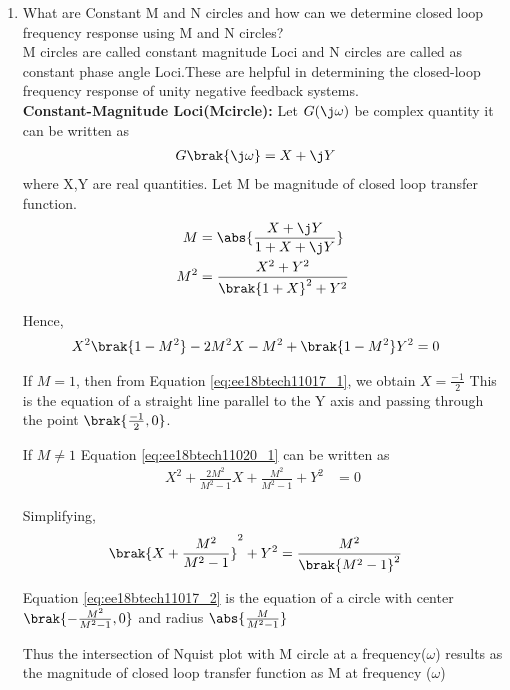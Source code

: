 \begin{enumerate}[label=\thesection.\arabic*.,ref=\thesection.\theenumi]

\item
What are Constant M and N circles and how can we determine closed loop frequency response using M and N circles? \\
\solution 
M circles are called constant magnitude Loci and N circles are called as
constant phase angle Loci.These are helpful in determining the closed-loop frequency response of unity negative feedback systems. \\

\textbf{Constant-Magnitude Loci(Mcircle):} Let $G(\j\omega)$ be complex quantity it can be written as 
\begin{align}
G\brak{\j \omega} &= X+\j Y
\end{align}
where X,Y are real quantities.
Let M be magnitude of closed loop transfer function.
\begin{align}
M &= \abs{\frac{X+\j Y}{1+X+\j Y}}
\\
M^{2} &= \frac{X^{2}+Y^{2}}{\brak{1+X}^{2}+Y^{2}}
\label{eq:ee18btech11020_3}
\end{align}

Hence,
\begin{align}
X^{2}\brak{1-M^{2}}-2M^{2}X-M^{2}+\brak{1-M^{2}}Y^{2} &= 0
\label{eq:ee18btech11020_1}
\end{align}

If $M=1$, then from Equation \eqref{eq:ee18btech11017_1}, we obtain $X =\frac{-1}{2}$ This is the equation of a straight line parallel to the Y axis and passing through the point $\brak{\frac{-1}{2},0}$.

If $M \neq 1$ Equation \eqref{eq:ee18btech11020_1} can be written as
\begin{align}
X^{2}+\frac{2M^{2}}{M^{2}-1}X+\frac{M^{2}}{M^{2}-1}+Y^{2} &= 0
\end{align}

Simplifying,
\begin{align}
\brak{X+\frac{M^{2}}{M^{2}-1}}^{2}+Y^{2} &= \frac{M^{2}}{\brak{M^{2}-1}^{2}}
\label{eq:ee18btech11020_2}
\end{align}

Equation \eqref{eq:ee18btech11017_2} is the equation of a circle with center 
$\brak{-\frac{M^{2}}{M^{2}-1},0}$ and radius $\abs{\frac{M}{M^{2}-1}}$

Thus the intersection of Nquist plot with M circle at a frequency($\omega$) results as the magnitude of closed loop transfer function as M at frequency ($\omega$)


\end{enumerate}
